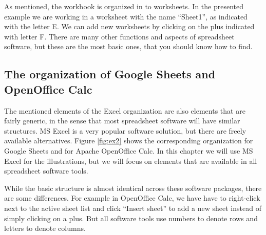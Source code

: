 \documentclass[]{book}
\begin{document}
As mentioned, the workbook is organized in to worksheets. In the presented example we are working in a worksheet with the name ``Sheet1'', as indicated with the letter E. We can add new worksheets by clicking on the plus indicated with letter F. There are many other functions and aspects of spreadsheet software, but these are the most basic ones, that you should know how to find.

\hypertarget{the-organization-of-google-sheets-and-openoffice-calc}{%
\subsection{The organization of Google Sheets and OpenOffice Calc}\label{the-organization-of-google-sheets-and-openoffice-calc}}

The mentioned elements of the Excel organization are also elements that are fairly generic, in the sense that most spreadsheet software will have similar structures. MS Excel is a very popular software solution, but there are freely available alternatives. Figure \ref{fig:ex2} shows the corresponding organization for Google Sheets and for Apache OpenOffice Calc. In this chapter we will use MS Excel for the illustrations, but we will focus on elements that are available in all spreadsheet software tools.

While the basic structure is almost identical across these software packages, there are some differences. For example in OpenOffice Calc, we have have to right-click next to the active sheet list and click ``Insert sheet'' to add a new sheet instead of simply clicking on a plus. But all software tools use numbers to denote rows and letters to denote columns.
\end{document}
